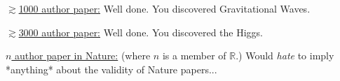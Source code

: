 \documentclass[11pt]{article}
\begin{document}
\medskip
\medskip
\noindent
\underline{$\gtrsim$1000 author paper:} Well done. You discovered Gravitational Waves.   

\medskip
\medskip
\noindent
\underline{$\gtrsim$3000 author paper:} Well done. You discovered the Higgs.  


\medskip
\medskip 
\noindent
\underline{$n$ author paper in Nature:} (where $n$ is a member of $\mathbb{R}$.) 
Would {\it hate} to imply *anything* about the validity of Nature papers...

\iffalse
\newpage
\topmargin=0.00mm

\medskip
\medskip 
\noindent
\underline{Single author on a humorous document tenuously related to astronomy:} Congratulations: You've got an ERF and you've clearly got too much time on your hands!




\fi
\end{document}
